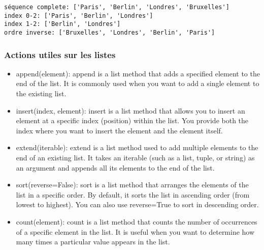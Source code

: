 \documentclass[11pt]{article}
\begin{document}
    \begin{Verbatim}[commandchars=\\\{\}]
séquence complete: ['Paris', 'Berlin', 'Londres', 'Bruxelles']
index 0-2: ['Paris', 'Berlin', 'Londres']
index 1-2: ['Berlin', 'Londres']
ordre inverse: ['Bruxelles', 'Londres', 'Berlin', 'Paris']
    \end{Verbatim}

    \hypertarget{actions-utiles-sur-les-listes}{%
\subsubsection{Actions utiles sur les
listes}\label{actions-utiles-sur-les-listes}}

\begin{itemize}
\item
  append(element): append is a list method that adds a specified element
  to the end of the list. It is commonly used when you want to add a
  single element to the existing list.
\item
  insert(index, element): insert is a list method that allows you to
  insert an element at a specific index (position) within the list. You
  provide both the index where you want to insert the element and the
  element itself.
\item
  extend(iterable): extend is a list method used to add multiple
  elements to the end of an existing list. It takes an iterable (such as
  a list, tuple, or string) as an argument and appends all its elements
  to the end of the list.
\item
  sort(reverse=False): sort is a list method that arranges the elements
  of the list in a specific order. By default, it sorts the list in
  ascending order (from lowest to highest). You can also use
  reverse=True to sort in descending order.
\item
  count(element): count is a list method that counts the number of
  occurrences of a specific element in the list. It is useful when you
  want to determine how many times a particular value appears in the
  list.
\end{itemize}
\end{document}
